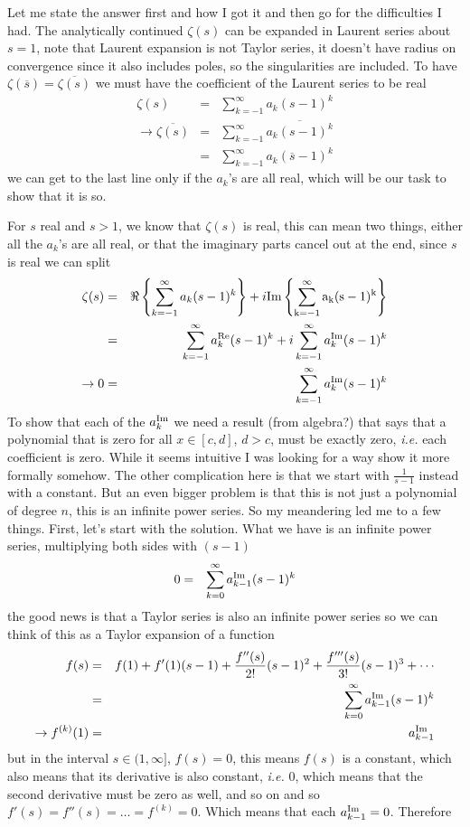 \documentclass[aps,preprint,preprintnumbers,nofootinbib,showpacs,prd]{revtex4-1}
\newcommand{\ie}{{\it i.e.} }
\newcommand{\nbea}{\begin{eqnarray*}}
\newcommand{\neea}{\end{eqnarray*}}
\def\Im{\rm Im}
\begin{document}
Let me state the answer first and how I got it and then go for the difficulties I had. The analytically continued $\zeta(s)$ can be expanded in Laurent series about $s=1$, note that Laurent expansion is not Taylor series, it doesn't have radius on convergence since it also includes poles, so the singularities are included. To have $\zeta(\overline{s}) = \overline{\zeta(s)}$ we must have the coefficient of the Laurent series to be real
%
\nbea
\zeta(s) & = & \sum_{k=-1}^\infty a_k (s-1)^k \\
\to \overline{\zeta(s)} & = & \sum_{k=-1}^\infty \overline{a_k (s-1)^k} \\
& = & \sum_{k=-1}^\infty a_k (\overline{s}-1)^k
\neea
%
we can get to the last line only if the $a_k$'s are all real, which will be our task to show that it is so.

For $s$ real and $s > 1$, we know that $\zeta(s)$ is real, this can mean two things, either all the $a_k$'s are all real, or that the imaginary parts cancel out at the end, since $s$ is real we can split
%
\nbea
\zeta(s) & = & \Re\left\{\sum_{k=-1}^\infty a_k (s-1)^k\right\} + i\Im\left\{ \sum_{k=-1}^\infty a_k (s-1)^k \right\} \\
& = & \sum_{k=-1}^\infty a^{\rm Re}_k (s-1)^k + i\sum_{k=-1}^\infty a^{\rm Im}_k (s-1)^k \\
\to 0 & = & \sum_{k=-1}^\infty a^{\rm Im}_k (s-1)^k
\neea
%
To show that each of the $a^{\rm Im}_k$ we need a result (from algebra?) that says that a polynomial that is zero for all $x\in [c,d]$, $d > c$, must be exactly zero, \ie each coefficient is zero. While it seems intuitive I was looking for a way show it more formally somehow. The other complication here is that we start with $\frac{1}{s-1}$ instead with a constant. But an even bigger problem is that this is not just a polynomial of degree $n$, this is an infinite power series. So my meandering led me to a few things. First, let's start with the solution. What we have is an infinite power series, multiplying both sides with $(s-1)$
%
\nbea
0 & = & \sum_{k=0}^\infty a_{k-1}^{\rm Im} (s-1)^k 
\neea
%
the good news is that a Taylor series is also an infinite power series so we can think of this as a Taylor expansion of a function
%
\nbea
f(s) & = & f(1) + f'(1)(s-1) + \frac{f''(s)}{2!}(s-1)^2 + \frac{f'''(s)}{3!}(s-1)^3 + \cdots \\
& = & \sum_{k=0}^\infty a_{k-1}^{\rm Im} (s-1)^k \\
\to f^{(k)}(1) & = & a_{k-1}^{\rm Im}
\neea
%
but in the interval $s \in (1,\infty]$, $f(s) = 0$, this means $f(s)$ is a constant, which also means that its derivative is also constant, \ie 0, which means that the second derivative must be zero as well, and so on and so $f'(s) = f''(s) = \dots = f^{(k)} = 0$. Which means that each $a_{k-1}^{\rm Im} = 0$. Therefore
\end{document}
